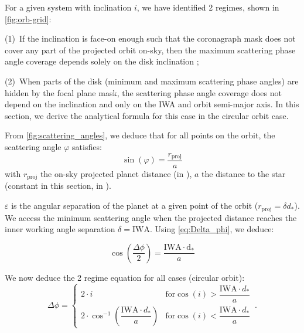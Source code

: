 \documentclass[
    usenatbib,
]{mnras}
\begin{document}
For a given system with inclination $i$, we have identified 2 regimes, shown in \cref{fig:orb-grid}:

(1)~If the inclination is face-on enough such that the coronagraph mask does not cover any part of the projected orbit on-sky, then the maximum scattering phase angle coverage depends solely on the disk inclination ;

(2)~When parts of the disk (minimum and maximum scattering phase angles) are hidden by the focal plane mask, the scattering phase angle coverage does not depend on the inclination and only on the IWA and orbit semi-major axis. In this section, we derive the analytical formula for this case in the circular orbit case. 

%    

From \cref{fig:scattering_angles}, we deduce that for all points on the orbit, the scattering angle $\varphi$ satisfies:
\begin{equation}
    \sin(\varphi) = \frac{r_\mathrm{proj}}{a}
\end{equation}
with $r_\mathrm{proj}$ the on-sky projected planet distance (in \si{\au}), $a$ the distance to the star (constant in this section, in \si{\au}). 

$\varepsilon$ is the angular separation of the planet at a given point of the orbit ($r_\mathrm{proj} = \delta d_*$). 
We access the minimum scattering angle when the projected distance reaches the inner working angle separation $\delta = \mathrm{IWA}$. 
Using \cref{eq:Delta_phi}, we deduce:

\begin{equation}
    \cos\left(\dfrac{\Delta \phi}{2}\right) = \frac{\mathrm{IWA \cdot d_*}}{a}
\end{equation}

We now deduce the 2 regime equation for all cases (circular orbit): 
\begin{equation}
\label{eq:Delta_phi_max}
    \Delta \phi = 
    \begin{cases}
        2 \cdot i & \textrm{for} \cos(i) > \dfrac{\mathrm{IWA}\cdot d_* }{a}
  \\ 
        2 \cdot \cos^{-1}\left(\dfrac{\mathrm{IWA}\cdot d_* }{a}\right)  & \textrm{for} \cos(i) < \dfrac{\mathrm{IWA}\cdot d_* }{a}
    \end{cases}\,.
\end{equation}
\end{document}
